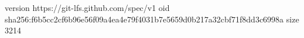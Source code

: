 version https://git-lfs.github.com/spec/v1
oid sha256:f6b5cc2cf6b96e56f09a4ea4e79f4031b7e5659d0b217a32cbf71f8dd3c6998a
size 3214
